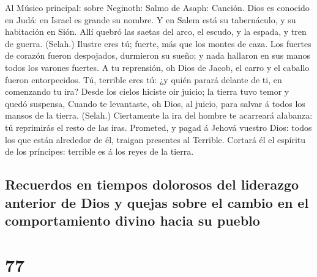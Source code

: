  Al Músico principal: sobre Neginoth: Salmo de Asaph:
Canción. Dios es conocido en Judá: en Israel es grande su nombre.
 Y en Salem está su tabernáculo, y su habitación en Sión.
 Allí quebró las saetas del arco, el escudo, y la espada,
y tren de guerra. (Selah.)  Ilustre eres tú; fuerte, más
que los montes de caza.  Los fuertes de corazón fueron
despojados, durmieron su sueño; y nada hallaron en sus manos todos los
varones fuertes.  A tu reprensión, oh Dios de Jacob, el
carro y el caballo fueron entorpecidos.  Tú, terrible eres
tú: ¿y quién parará delante de ti, en comenzando tu ira? 
Desde los cielos hiciste oir juicio; la tierra tuvo temor y quedó
suspensa,  Cuando te levantaste, oh Dios, al juicio, para
salvar á todos los mansos de la tierra. (Selah.) 
Ciertamente la ira del hombre te acarreará alabanza: tú reprimirás el
resto de las iras.  Prometed, y pagad á Jehová vuestro
Dios: todos los que están alrededor de él, traigan presentes al
Terrible.  Cortará él el espíritu de los príncipes:
terrible es á los reyes de la tierra.

\hypertarget{recuerdos-en-tiempos-dolorosos-del-liderazgo-anterior-de-dios-y-quejas-sobre-el-cambio-en-el-comportamiento-divino-hacia-su-pueblo}{%
\subsection{Recuerdos en tiempos dolorosos del liderazgo anterior de
Dios y quejas sobre el cambio en el comportamiento divino hacia su
pueblo}\label{recuerdos-en-tiempos-dolorosos-del-liderazgo-anterior-de-dios-y-quejas-sobre-el-cambio-en-el-comportamiento-divino-hacia-su-pueblo}}

\hypertarget{section-76}{%
\section{77}\label{section-76}}

